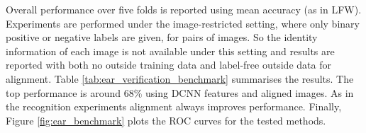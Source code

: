 Overall performance over five folds is reported using mean accuracy (as in LFW). Experiments are performed under the image-restricted setting, where only binary positive or negative labels are given, for pairs of images. So the identity information of each image is not available under this setting and results are reported with both no outside training data and label-free outside data for alignment. Table \ref{tab:ear_verification_benchmark} summarises the results. The top performance is around 68$\%$ using DCNN features and aligned images. As in the recognition experiments alignment always improves performance. Finally, Figure  \ref{fig:ear_benchmark} plots the ROC curves for the tested methods.









